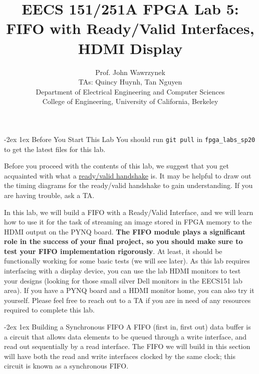 \documentclass[11pt]{article}
\makeatletter
\renewcommand{\section}
{\@startsection {section}{1}{0pt}
 {-2ex}
 {1ex}
 {\bfseries\Large}}
\makeatother
\begin{document}
\def\PYZsq{\textquotesingle}
\title{\vspace{-0.4in}\Large \bf EECS 151/251A FPGA Lab 5:\\FIFO with Ready/Valid Interfaces, HDMI Display\vspace{-0.1in}}

\author{Prof. John Wawrzynek \\
TAs: Quincy Huynh, Tan Nguyen \\ Department of Electrical Engineering and Computer Sciences\\
College of Engineering, University of California, Berkeley}
\date{}
\maketitle

\section{Before You Start This Lab}
You should run \verb|git pull| in \verb|fpga_labs_sp20| to get the latest files for this lab.

Before you proceed with the contents of this lab, we suggest that you get acquainted with what a \href{http://inst.eecs.berkeley.edu/~eecs151/sp20/files/verilog/ready_valid_interface.pdf}{ready/valid handshake} is. It may be helpful to draw out the timing diagrams for the ready/valid handshake to gain understanding. If you are having trouble, ask a TA. 

In this lab, we will build a FIFO with a Ready/Valid Interface, and we will learn how to use it for the task of streaming an image stored in FPGA memory to the HDMI output on the PYNQ board. \textbf{The FIFO module plays a significant role in the success of your final project, so you should make sure to test your FIFO implementation rigorously}. At least, it should be functionally working for some basic tests (we will see later). As this lab requires interfacing with a display device, you can use the lab HDMI monitors to test your designs (looking for those small silver Dell monitors in the EECS151 lab area). If you have a PYNQ board and a HDMI monitor home, you can also try it yourself. Please feel free to reach out to a TA if you are in need of any resources required to complete this lab.

\section{Building a Synchronous FIFO}
A FIFO (first in, first out) data buffer is a circuit that allows data elements to be queued through a write interface, and read out sequentially by a read interface.
The FIFO we will build in this section will have both the read and write interfaces clocked by the same clock; this circuit is known as a synchronous FIFO.
\end{document}
